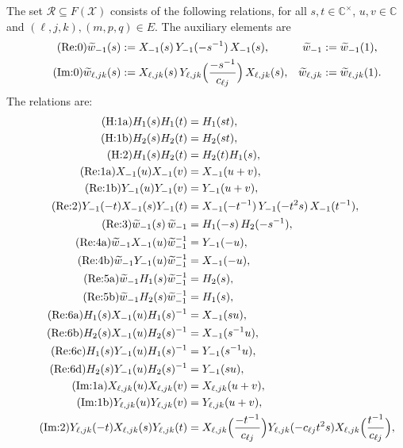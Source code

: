 \documentclass[11pt]{article}
\theoremstyle{definition}
\theoremstyle{remark}
\newcommand{\C}{\mathbb{C}}
\newcommand{\cX}{\mathcal{X}}
\newcommand{\cR}{\mathcal{R}}
\begin{document}
The set $\cR\subseteq F(\cX)$ consists of the following relations, for all $s,t\in\C^\times$, $u,v\in\C$ and $(\ell,j,k),(m,p,q)\in E$. The auxiliary elements are
\begin{align*}
\tag{Re:0}
\widetilde w_{-1}(s)&:=X_{-1}(s)\,Y_{-1}(-s^{-1})\,X_{-1}(s), & \widetilde w_{-1}&:=\widetilde w_{-1}(1),\\
\tag{Im:0}
\widetilde w_{\ell,jk}(s)&:=X_{\ell,jk}(s)\,Y_{\ell,jk}\Bigl(\frac{-s^{-1}}{c_{\ell j}}\Bigr)\,X_{\ell,jk}(s), & \widetilde w_{\ell,jk}&:=\widetilde w_{\ell,jk}(1).
\end{align*}
The relations are:
\begingroup\allowdisplaybreaks
\begin{align*}
\tag{H:1a} H_1(s)H_1(t)&=H_1(st),\\
\tag{H:1b} H_2(s)H_2(t)&=H_2(st),\\
\tag{H:2} H_1(s)H_2(t)&=H_2(t)H_1(s),\\
\tag{Re:1a} X_{-1}(u)X_{-1}(v)&=X_{-1}(u+v),\\
\tag{Re:1b} Y_{-1}(u)Y_{-1}(v)&=Y_{-1}(u+v),\\
\tag{Re:2} Y_{-1}(-t)X_{-1}(s)Y_{-1}(t)&=X_{-1}(-t^{-1})\,Y_{-1}(-t^2s)\,X_{-1}(t^{-1}),\\
\tag{Re:3} \widetilde w_{-1}(s)\,\widetilde w_{-1}&=H_1(-s)\,H_2(-s^{-1}),\\
\tag{Re:4a} \widetilde w_{-1}X_{-1}(u)\widetilde w_{-1}^{-1}&=Y_{-1}(-u),\\
\tag{Re:4b} \widetilde w_{-1}Y_{-1}(u)\widetilde w_{-1}^{-1}&=X_{-1}(-u),\\
\tag{Re:5a} \widetilde w_{-1}H_1(s)\widetilde w_{-1}^{-1}&=H_2(s),\\
\tag{Re:5b} \widetilde w_{-1}H_2(s)\widetilde w_{-1}^{-1}&=H_1(s),\\
\tag{Re:6a} H_1(s)X_{-1}(u)H_1(s)^{-1}&=X_{-1}(su),\\
\tag{Re:6b} H_2(s)X_{-1}(u)H_2(s)^{-1}&=X_{-1}(s^{-1}u),\\
\tag{Re:6c} H_1(s)Y_{-1}(u)H_1(s)^{-1}&=Y_{-1}(s^{-1}u),\\
\tag{Re:6d} H_2(s)Y_{-1}(u)H_2(s)^{-1}&=Y_{-1}(su),\\
\tag{Im:1a} X_{\ell,jk}(u)X_{\ell,jk}(v)&=X_{\ell,jk}(u+v),\\
\tag{Im:1b} Y_{\ell,jk}(u)Y_{\ell,jk}(v)&=Y_{\ell,jk}(u+v),\\
\tag{Im:2} Y_{\ell,jk}(-t)X_{\ell,jk}(s)Y_{\ell,jk}(t)&=X_{\ell,jk}\Bigl(\frac{-t^{-1}}{c_{\ell j}}\Bigr)Y_{\ell,jk}(-c_{\ell j}t^2s)X_{\ell,jk}\Bigl(\frac{t^{-1}}{c_{\ell j}}\Bigr),\\

\end{align*}
\end{document}
